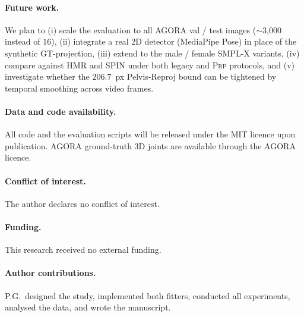 \documentclass[twocolumn,10pt]{svjour3}
\newcommand{\prp}{\textsc{Prp}}
\begin{document}
\paragraph{Future work.}
We plan to (i) scale the evaluation to all AGORA val / test images ($\sim$3{,}000 instead of $16$), (ii) integrate a real 2D detector (MediaPipe Pose) in place of the synthetic GT-projection, (iii) extend to the male / female SMPL-X variants, (iv) compare against HMR and SPIN under both legacy and \prp{} protocols, and (v) investigate whether the $206.7$~px Pelvis-Reproj bound can be tightened by temporal smoothing across video frames.

\paragraph{Data and code availability.}
All code and the evaluation scripts will be released under the MIT licence upon publication. AGORA ground-truth 3D joints are available through the AGORA licence.

\paragraph{Conflict of interest.}
The author declares no conflict of interest.

\paragraph{Funding.}
This research received no external funding.

\paragraph{Author contributions.}
P.G.\ designed the study, implemented both fitters, conducted all experiments, analysed the data, and wrote the manuscript.
\end{document}
